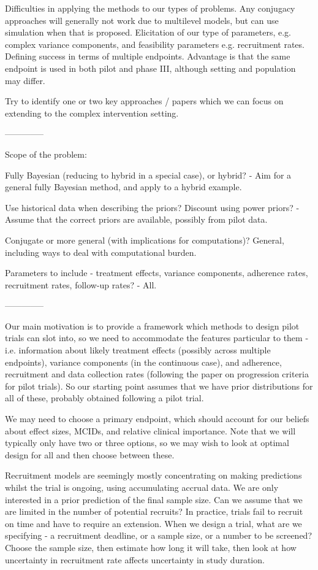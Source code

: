 \documentclass{article} %
\begin{document}
Difficulties in applying the methods to our types of problems. Any conjugacy approaches will generally not work due to multilevel models, but can use simulation when that is proposed. Elicitation of our type of parameters, e.g. complex variance components, and feasibility parameters e.g. recruitment rates. Defining success in terms of multiple endpoints. Advantage is that the same endpoint is used in both pilot and phase III, although setting and population may differ.

Try to identify one or two key approaches / papers which we can focus on extending to the complex intervention setting.

--------------

Scope of the problem:

Fully Bayesian (reducing to hybrid in a special case), or hybrid? - Aim for a general fully Bayesian method, and apply to a hybrid example.

Use historical data when describing the priors? Discount using power priors? - Assume that the correct priors are available, possibly from pilot data.

Conjugate or more general (with implications for computations)? General, including ways to deal with computational burden.

Parameters to include - treatment effects, variance components, adherence rates, recruitment rates, follow-up rates? - All.

--------------

Our main motivation is to provide a framework which methods to design pilot trials can slot into, so we need to accommodate the features particular to them - i.e. information about likely treatment effects (possibly across multiple endpoints), variance components (in the continuous case), and adherence, recruitment and data collection rates (following the paper on progression criteria for pilot trials). So our starting point assumes that we have prior distributions for all of these, probably obtained following a pilot trial.

We may need to choose a primary endpoint, which should account for our beliefs about effect sizes, MCIDs, and relative clinical importance. Note that we will typically only have two or three options, so we may wish to look at optimal design for all and then choose between these. 

Recruitment models are seemingly mostly concentrating on making predictions whilst the trial is ongoing, using accumulating accrual data. We are only interested in a prior prediction of the final sample size. Can we assume that we are limited in the number of potential recruits? In practice, trials fail to recruit on time and have to require an extension. When we design a trial, what are we specifying - a recruitment deadline, or a sample size, or a number to be screened? Choose the sample size, then estimate how long it will take, then look at how uncertainty in recruitment rate affects uncertainty in study duration.
\end{document}
